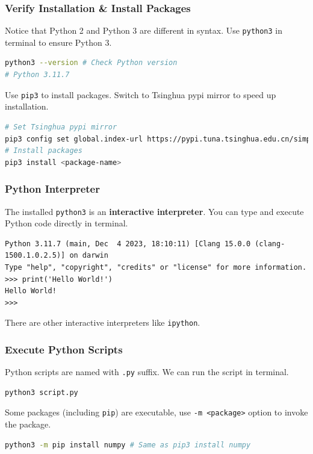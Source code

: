 \documentclass[beamer, en, version=2.0]{huangfusl-template}
\begin{document}
    \begin{frame}[fragile]
        \frametitle{Verify Installation \& Install Packages}

        Notice that Python 2 and Python 3 are different in syntax. Use {\footnotesize\verb|python3|} in terminal to ensure Python 3.

        \begin{lstlisting}[language=bash]
python3 --version # Check Python version
# Python 3.11.7
        \end{lstlisting}

        Use {\footnotesize\verb|pip3|} to install packages. {\color{darkred}Switch to Tsinghua pypi mirror to speed up installation}.

        \begin{lstlisting}[language=bash]
# Set Tsinghua pypi mirror
pip3 config set global.index-url https://pypi.tuna.tsinghua.edu.cn/simple
# Install packages
pip3 install <package-name>
        \end{lstlisting}

    \end{frame}
    \begin{frame}[fragile]
        \frametitle{Python Interpreter}

        The installed {\footnotesize\verb|python3|} is an \textbf{interactive interpreter}. You can type and execute Python code directly in terminal.

        \begin{lstlisting}[breaklines]
Python 3.11.7 (main, Dec  4 2023, 18:10:11) [Clang 15.0.0 (clang-1500.1.0.2.5)] on darwin
Type "help", "copyright", "credits" or "license" for more information.
>>> print('Hello World!')
Hello World!
>>>
        \end{lstlisting}

        There are other interactive interpreters like {\footnotesize\verb|ipython|}.
    \end{frame}
    \begin{frame}[fragile]
        \frametitle{Execute Python Scripts}

        Python scripts are named with {\footnotesize\verb|.py|} suffix. We can run the script in terminal.

        \begin{lstlisting}[language=bash]
python3 script.py
        \end{lstlisting}

        Some packages (including {\footnotesize\verb|pip|}) are executable, use {\footnotesize\verb|-m <package>|} option to invoke the package.

        \begin{lstlisting}[language=bash]
python3 -m pip install numpy # Same as pip3 install numpy
        \end{lstlisting}
    \end{frame}
\end{document}

